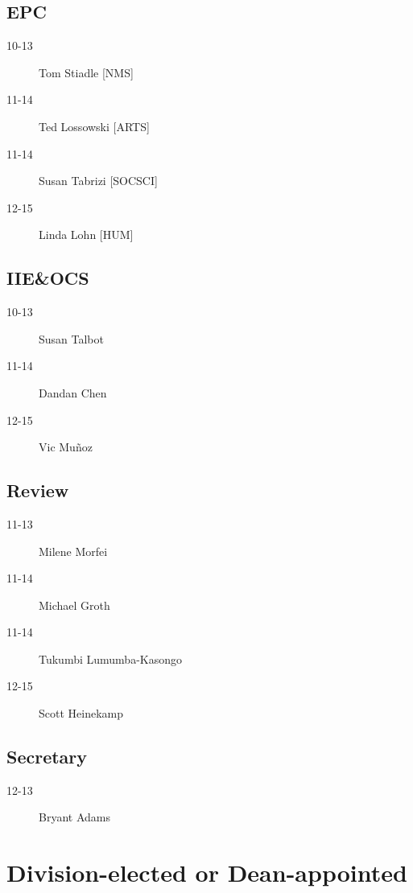 \documentclass[10pt, twocolumn]{amsart}
\newcommand{\noteMajor}[1]{}
\newcommand{\noteDivision}[1]{ [#1]}
\begin{document}
\subsection*{EPC}
\begin{description}
\item[10-13] Tom Stiadle \noteDivision{NMS}
\item[11-14] Ted Lossowski \noteDivision{ARTS}
\item[11-14] Susan Tabrizi \noteDivision{SOCSCI}
\item[12-15] Linda Lohn \noteDivision{HUM}
\end{description}

\pagebreak

\subsection*{IIE\&OCS}
\begin{description}
\item[10-13] Susan Talbot
\item[11-14] Dandan Chen
\item[12-15] Vic Mu\~noz
\end{description}

\subsection*{Review}
\begin{description}
\item[11-13] Milene Morfei \noteMajor{Psychology}
\item[11-14] Michael Groth \noteMajor{History}
\item[11-14] Tukumbi Lumumba-Kasongo \noteMajor{Political Science}
\item[12-15] Scott Heinekamp \noteMajor{Physics}
\end{description}

\subsection*{Secretary}
\begin{description}
\item[12-13] Bryant Adams
\end{description}

\section*{Division-elected or Dean-appointed}
\end{document}
